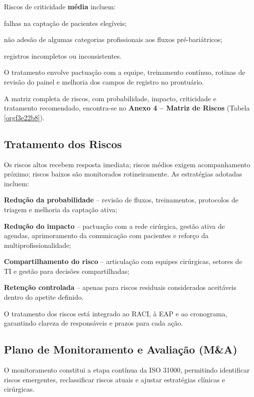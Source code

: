 \documentclass[12pt]{article}
\begin{document}
Riscos de criticidade \textbf{média} incluem:

\begin{hlevelthree}
\item falhas na captação de pacientes elegíveis;
\item não adesão de algumas categorias profissionais aos fluxos pré-bariátricos;
\item registros incompletos ou inconsistentes.
\end{hlevelthree}

O tratamento envolve pactuação com a equipe, treinamento contínuo, rotinas de revisão do painel e melhoria dos campos de registro no prontuário.

A matriz completa de riscos, com probabilidade, impacto, criticidade e tratamento recomendado, encontra-se no \textbf{Anexo 4 – Matriz de Riscos} (Tabela \ref{orgf3e22b8}).

\subsection{Tratamento dos Riscos}
\label{sec:orgcd1a8d5}
Os riscos altos recebem resposta imediata; riscos médios exigem acompanhamento próximo; riscos baixos são monitorados rotineiramente. As estratégias adotadas incluem:

\begin{hleveltwo}
\item \textbf{Redução da probabilidade} – revisão de fluxos, treinamentos, protocolos de triagem e melhoria da captação ativa;
\item \textbf{Redução do impacto} – pactuação com a rede cirúrgica, gestão ativa de agendas, aprimoramento da comunicação com pacientes e reforço da multiprofissionalidade;
\item \textbf{Compartilhamento do risco} – articulação com equipes cirúrgicas, setores de TI e gestão para decisões compartilhadas;
\item \textbf{Retenção controlada} – apenas para riscos residuais considerados aceitáveis dentro do apetite definido.
\end{hleveltwo}

O tratamento dos riscos está integrado ao RACI, à EAP e ao cronograma, garantindo clareza de responsáveis e prazos para cada ação.

\subsection{Plano de Monitoramento e Avaliação (M\&A)}
\label{sec:orga5eaf7d}
O monitoramento constitui a etapa contínua da ISO 31000, permitindo identificar riscos emergentes, reclassificar riscos atuais e ajustar estratégias clínicas e cirúrgicas.
\end{document}
